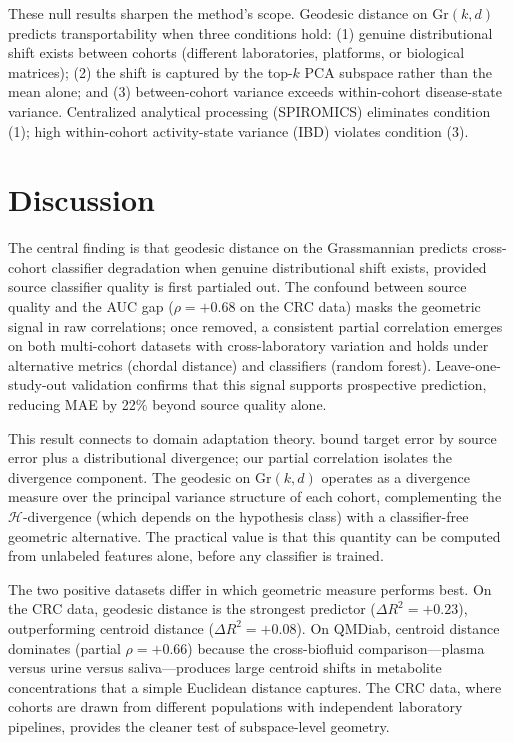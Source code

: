 \documentclass{article}
\begin{document}
These null results sharpen the method's scope. Geodesic distance on $\mathrm{Gr}(k,d)$ predicts transportability when three conditions hold: (1) genuine distributional shift exists between cohorts (different laboratories, platforms, or biological matrices); (2) the shift is captured by the top-$k$ PCA subspace rather than the mean alone; and (3) between-cohort variance exceeds within-cohort disease-state variance. Centralized analytical processing (SPIROMICS) eliminates condition (1); high within-cohort activity-state variance (IBD) violates condition (3).


\section{Discussion}
\label{sec:discussion}

The central finding is that geodesic distance on the Grassmannian predicts cross-cohort classifier degradation when genuine distributional shift exists, provided source classifier quality is first partialed out. The confound between source quality and the AUC gap ($\rho = +0.68$ on the CRC data) masks the geometric signal in raw correlations; once removed, a consistent partial correlation emerges on both multi-cohort datasets with cross-laboratory variation and holds under alternative metrics (chordal distance) and classifiers (random forest). Leave-one-study-out validation confirms that this signal supports prospective prediction, reducing MAE by 22\% beyond source quality alone.

This result connects to domain adaptation theory. \citet{bendavid2010theory} bound target error by source error plus a distributional divergence; our partial correlation isolates the divergence component. The geodesic on $\mathrm{Gr}(k, d)$ operates as a divergence measure over the principal variance structure of each cohort, complementing the $\mathcal{H}$-divergence (which depends on the hypothesis class) with a classifier-free geometric alternative. The practical value is that this quantity can be computed from unlabeled features alone, before any classifier is trained.

The two positive datasets differ in which geometric measure performs best. On the CRC data, geodesic distance is the strongest predictor ($\Delta R^2 = +0.23$), outperforming centroid distance ($\Delta R^2 = +0.08$). On QMDiab, centroid distance dominates (partial $\rho = +0.66$) because the cross-biofluid comparison---plasma versus urine versus saliva---produces large centroid shifts in metabolite concentrations that a simple Euclidean distance captures. The CRC data, where cohorts are drawn from different populations with independent laboratory pipelines, provides the cleaner test of subspace-level geometry.
\end{document}
